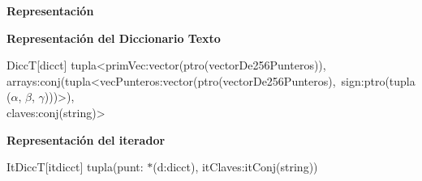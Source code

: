 \documentclass[10pt, a4paper]{article}
\newcommand{\tab}{\hspace*{7mm}}
\newenvironment{Representacion}{%
  \vspace*{2ex}%
  \noindent\textbf{\Large Representaci\'{o}n}%
  \vspace*{2ex}%
}{}
\newcommand{\Title}[1]{
  \vspace*{1ex}\par\noindent\textbf{\large #1}\par
}
\begin{document}
\begin{Representacion}
	\Title{Representaci\'{o}n del Diccionario Texto}

	\begin{Estructura}{DiccT}[dicct]
		tupla<primVec:vector(ptro(vectorDe256Punteros)),\\
		\tab arrays:conj(tupla<vecPunteros:vector(ptro(vectorDe256Punteros),\ sign:ptro(tupla($\alpha$, $\beta$, $\gamma$)))>),\\
		\tab claves:conj(string)> 
  	\end{Estructura}
	
	\Title{Representaci\'{o}n del iterador}

	\begin{Estructura}{ItDiccT}[itdicct]
		tupla(punt: $\ast$(d:dicct), itClaves:itConj(string))
  	\end{Estructura}
   \end{Representacion}
\end{document}
